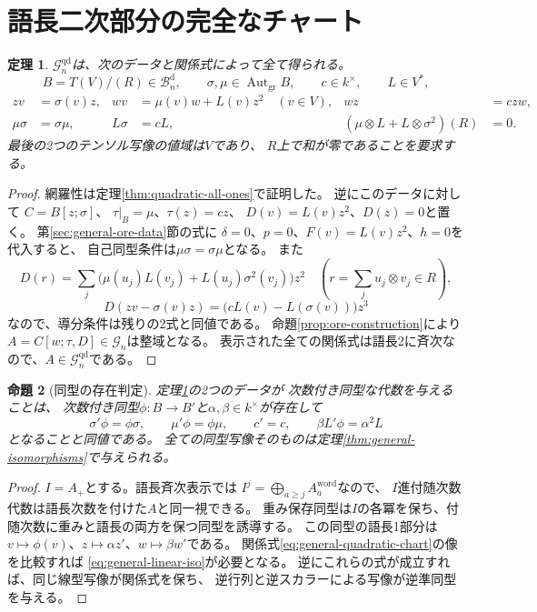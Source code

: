 \documentclass[11pt,a4paper]{ltjsarticle}
\newtheorem{theorem}{定理}[section]
\newtheorem{proposition}[theorem]{命題}
\theoremstyle{definition}
\newcommand{\Aut}{\operatorname{Aut}}
\newcommand{\Gclass}{\mathcal G}
\newcommand{\Bclass}{\mathcal B}
\begin{document}
\section{語長二次部分の完全なチャート}\label{sec:quadratic-chart}
\begin{theorem}\label{thm:general-quadratic-classification}
$\Gclass_n^{\mathrm{qd}}$は、次のデータと関係式によって全て得られる。
\[
B=T(V)/(R)\in\Bclass_n^{\mathrm d},\qquad
\sigma,\mu\in\Aut_{\mathrm{gr}}B,\qquad
c\in k^\times,\qquad L\in V^*,
\]
\begin{align}
zv&=\sigma(v)z,&
wv&=\mu(v)w+L(v)z^2\quad(v\in V),&
wz&=c zw,\label{eq:general-quadratic-chart}\\
\mu\sigma&=\sigma\mu,&
L\sigma&=cL,&
(\mu\otimes L+L\otimes\sigma^2)(R)&=0.\label{eq:general-quadratic-compatibility}
\end{align}
最後の2つのテンソル写像の値域は$V$であり、
$R$上で和が零であることを要求する。
\end{theorem}

\begin{proof}
網羅性は定理\ref{thm:quadratic-all-ones}で証明した。
逆にこのデータに対して
$C=B[z;\sigma]$、
$\tau|_B=\mu$、$\tau(z)=cz$、
$D(v)=L(v)z^2$、$D(z)=0$と置く。
第\ref{sec:general-ore-data}節の式に
$\delta=0$、$p=0$、$F(v)=L(v)z^2$、$h=0$を代入すると、
自己同型条件は$\mu\sigma=\sigma\mu$となる。
また
\[
D(r)=\sum_j\bigl(\mu(u_j)L(v_j)+L(u_j)\sigma^2(v_j)\bigr)z^2
\quad\left(r=\sum_j u_j\otimes v_j\in R\right),
\]
\[
D(zv-\sigma(v)z)=\bigl(cL(v)-L(\sigma(v))\bigr)z^3
\]
なので、導分条件は残りの2式と同値である。
命題\ref{prop:ore-construction}により$A=C[w;\tau,D]\in\Gclass_n$は整域となる。
表示された全ての関係式は語長2に斉次なので、$A\in\Gclass_n^{\mathrm{qd}}$である。
\end{proof}

\begin{proposition}[同型の存在判定]\label{prop:general-quadratic-isomorphisms}
定理\ref{thm:general-quadratic-classification}の2つのデータが
次数付き同型な代数を与えることは、
次数付き同型$\phi:B\to B'$と$\alpha,\beta\in k^\times$が存在して
\begin{equation}\label{eq:general-linear-iso}
\sigma'\phi=\phi\sigma,\qquad
\mu'\phi=\phi\mu,\qquad
c'=c,\qquad
\beta L'\phi=\alpha^2 L
\end{equation}
となることと同値である。
全ての同型写像そのものは定理\ref{thm:general-isomorphisms}で与えられる。
\end{proposition}

\begin{proof}
$I=A_+$とする。語長斉次表示では
$I^j=\bigoplus_{a\geq j}A^{\mathrm{word}}_a$なので、
$I$進付随次数代数は語長次数を付けた$A$と同一視できる。
重み保存同型は$I$の各冪を保ち、付随次数に重みと語長の両方を保つ同型を誘導する。
この同型の語長1部分は
$v\mapsto\phi(v)$、$z\mapsto\alpha z'$、$w\mapsto\beta w'$である。
関係式\eqref{eq:general-quadratic-chart}の像を比較すれば
\eqref{eq:general-linear-iso}が必要となる。
逆にこれらの式が成立すれば、同じ線型写像が関係式を保ち、
逆行列と逆スカラーによる写像が逆準同型を与える。
\end{proof}
\end{document}
